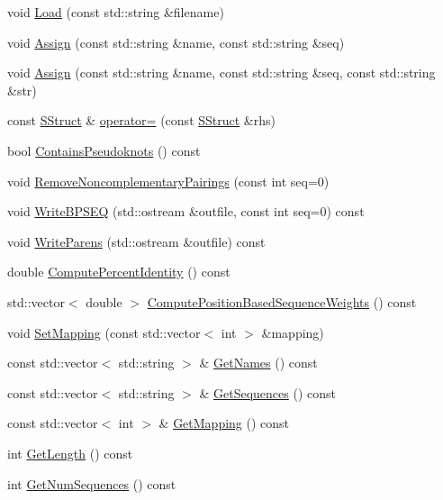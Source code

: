 \begin{DoxyCompactItemize}
\item 
void \hyperlink{class_s_struct_ab75b5c5dead14ed6112a04381af060fe}{Load} (const std\+::string \&filename)
\item 
void \hyperlink{class_s_struct_a661fc1833eccb901e361b644c756c2c1}{Assign} (const std\+::string \&name, const std\+::string \&seq)
\item 
void \hyperlink{class_s_struct_af2e8d0fd6505afb35134b9c33a37d82f}{Assign} (const std\+::string \&name, const std\+::string \&seq, const std\+::string \&str)
\item 
const \hyperlink{class_s_struct}{S\+Struct} \& \hyperlink{class_s_struct_a022b1fec957258cfb70b11485532be5d}{operator=} (const \hyperlink{class_s_struct}{S\+Struct} \&rhs)
\item 
bool \hyperlink{class_s_struct_a9126b795a3aac062ea5ddea558f31650}{Contains\+Pseudoknots} () const 
\item 
void \hyperlink{class_s_struct_adf88a89b209e7a409d209e8342185468}{Remove\+Noncomplementary\+Pairings} (const int seq=0)
\item 
void \hyperlink{class_s_struct_ac81e8f499dfaf6a4651569e9ee7ade27}{Write\+B\+P\+S\+E\+Q} (std\+::ostream \&outfile, const int seq=0) const 
\item 
void \hyperlink{class_s_struct_a6b12fb398bcf932a1cc414b8f6da0648}{Write\+Parens} (std\+::ostream \&outfile) const 
\item 
double \hyperlink{class_s_struct_abcab3b62ee1c201279042de4fdf3bd3f}{Compute\+Percent\+Identity} () const 
\item 
std\+::vector$<$ double $>$ \hyperlink{class_s_struct_a12063d1952c7fafc2fc5e19574dce47e}{Compute\+Position\+Based\+Sequence\+Weights} () const 
\item 
void \hyperlink{class_s_struct_a9a2bebbc61b1ff49a5599c8d72930809}{Set\+Mapping} (const std\+::vector$<$ int $>$ \&mapping)
\item 
const std\+::vector$<$ std\+::string $>$ \& \hyperlink{class_s_struct_a8d05e53d2524b32080f441527ee20ec1}{Get\+Names} () const 
\item 
const std\+::vector$<$ std\+::string $>$ \& \hyperlink{class_s_struct_ab18d689824218cacd1bf24d415ab82b9}{Get\+Sequences} () const 
\item 
const std\+::vector$<$ int $>$ \& \hyperlink{class_s_struct_a0a66c20e7cbc8978c759b38175f73dd3}{Get\+Mapping} () const 
\item 
int \hyperlink{class_s_struct_aa65cacd4668b451b6ca001c08a6005ec}{Get\+Length} () const 
\item 
int \hyperlink{class_s_struct_ac8f28842bd2186097b30be7ccabd7933}{Get\+Num\+Sequences} () const 
\end{DoxyCompactItemize}
